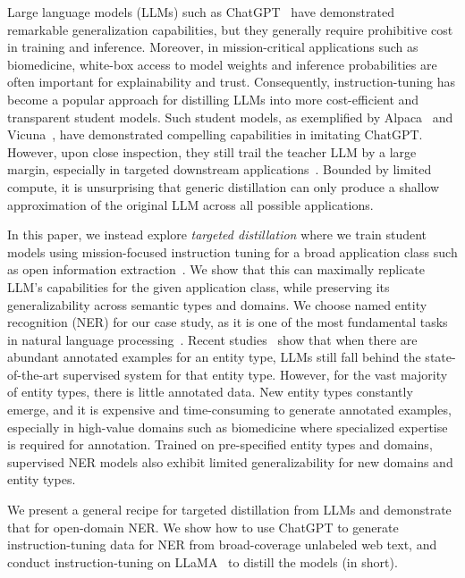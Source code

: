 Large language models (LLMs) such as ChatGPT~\citep{ouyang2022training,openai2023gpt4} have demonstrated remarkable generalization capabilities, but they generally require prohibitive cost in training and inference. Moreover, in mission-critical applications such as biomedicine, white-box access to model weights and inference probabilities are often important for explainability and trust. Consequently, instruction-tuning has become a popular approach for distilling LLMs into more cost-efficient and transparent student models. %
Such student models, as exemplified by Alpaca~\citep{alpaca} and Vicuna~\citep{vicuna-2023}, have demonstrated compelling capabilities in imitating ChatGPT. However, upon close inspection, they still trail the teacher LLM by a large margin, especially in targeted downstream applications~\citep{gudibande2023false}. Bounded by limited compute, it is unsurprising that generic distillation can only produce a shallow approximation of the original LLM across all possible applications.

In this paper, we instead explore {\it targeted distillation} where we train student models using mission-focused instruction tuning for a broad application class such as open information extraction~\citep{etzioni2008open}.
We show that this can maximally replicate LLM's capabilities for the given application class, while preserving its generalizability across semantic types and domains. 
We choose named entity recognition (NER) for our case study, as it is one of the most fundamental tasks in natural language processing~\citep{wu2017clinical,perera2020named}.
Recent studies~\citep{wei2023zero,li2023evaluating} show that when there are abundant annotated examples for an entity type, LLMs still fall behind the state-of-the-art supervised system for that entity type. 
However, for the vast majority of entity types, there is little annotated data. New entity types constantly emerge, and it is expensive and time-consuming to generate annotated examples, especially in high-value domains such as biomedicine where specialized expertise is required for annotation. 
Trained on pre-specified entity types and domains, supervised NER models also exhibit limited generalizability for new domains and entity types.

We present a general recipe for targeted distillation from LLMs and demonstrate that for open-domain NER. 
We show how to use ChatGPT to generate instruction-tuning data for NER from broad-coverage unlabeled web text, and conduct instruction-tuning on LLaMA~\citep{touvron2023llama} to distill the \longname models (\shortname in short).

